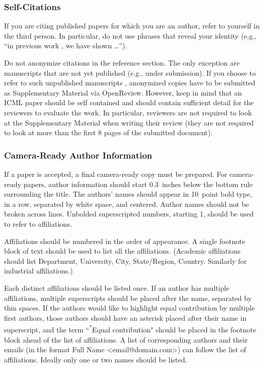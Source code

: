 \documentclass{article}
\theoremstyle{plain}
\theoremstyle{definition}
\theoremstyle{remark}
\begin{document}
\subsubsection{Self-Citations}

If you are citing published papers for which you are an author, refer
to yourself in the third person. In particular, do not use phrases
that reveal your identity (e.g., ``in previous work \cite{chow24}, we
have shown \ldots'').

Do not anonymize citations in the reference section. The only exception are manuscripts that are
not yet published (e.g., under submission). If you choose to refer to
such unpublished manuscripts \cite{anonymous}, anonymized copies have
to be submitted
as Supplementary Material via OpenReview\@. However, keep in mind that an ICML
paper should be self contained and should contain sufficient detail
for the reviewers to evaluate the work. In particular, reviewers are
not required to look at the Supplementary Material when writing their
review (they are not required to look at more than the first $8$ pages of the submitted document).

\subsubsection{Camera-Ready Author Information}
\label{final author}

If a paper is accepted, a final camera-ready copy must be prepared.
%
For camera-ready papers, author information should start 0.3~inches below the
bottom rule surrounding the title. The authors' names should appear in 10~point
bold type, in a row, separated by white space, and centered. Author names should
not be broken across lines. Unbolded superscripted numbers, starting 1, should
be used to refer to affiliations.

Affiliations should be numbered in the order of appearance. A single footnote
block of text should be used to list all the affiliations. (Academic
affiliations should list Department, University, City, State/Region, Country.
Similarly for industrial affiliations.)

Each distinct affiliations should be listed once. If an author has multiple
affiliations, multiple superscripts should be placed after the name, separated
by thin spaces. If the authors would like to highlight equal contribution by
multiple first authors, those authors should have an asterisk placed after their
name in superscript, and the term ``\textsuperscript{*}Equal contribution"
should be placed in the footnote block ahead of the list of affiliations. A
list of corresponding authors and their emails (in the format Full Name
\textless{}email@domain.com\textgreater{}) can follow the list of affiliations.
Ideally only one or two names should be listed.
\end{document}
